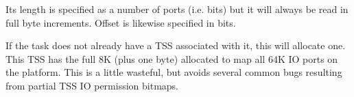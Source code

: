 \documentclass[11pt]{article}
\begin{document}
Its length is specified as a number of ports (i.e. bits) but it will always be read in full byte increments. Offset is likewise specified in bits.

If the task does not already have a TSS associated with it, this will allocate one. This TSS has the full 8K (plus one byte) allocated to map all 64K IO ports on the platform. This is a little wasteful, but avoids several common bugs resulting from partial TSS IO permission bitmaps.
\end{document}
